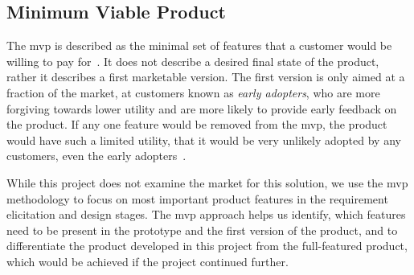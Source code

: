 \subsection{Minimum Viable Product}
The \acrfull{mvp} is described as the minimal set of features that a customer would be willing to pay for~\cite{SteveBlank2010PerfectionFeatureSet}. It does not describe a desired final state of the product, rather it describes a first marketable version. The first version is only aimed at a fraction of the market, at customers known as \textit{early adopters}, who are more forgiving towards lower utility and are more likely to provide early feedback on the product. If any one feature would be removed from the \acrshort{mvp}, the product would have such a limited utility, that it would be very unlikely adopted by any customers, even the early adopters~\cite{Junk2000TheProjects}.

While this project does not examine the market for this solution, we use the \acrshort{mvp} methodology to focus on most important product features in the requirement elicitation and design stages. The \acrshort{mvp} approach helps us identify, which features need to be present in the prototype and the first version of the product, and to differentiate the product developed in this project from the full-featured product, which would be achieved if the project continued further.
